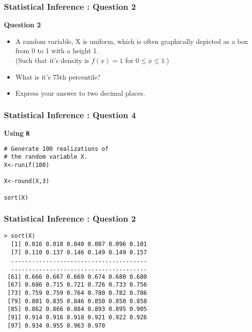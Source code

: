 \documentclass{beamer}
\begin{document}
\begin{frame}
\frametitle{Statistical Inference : Question 2}
\Large
\vspace{-1cm}
\textbf{Question 2}
\begin{itemize}
\item A random variable, X is uniform, which is often graphically depicted as a box from 0 to 1 with a height 1. \\(Such that it's density is $f(x)=1$ for $0\leq x\leq 1$.) \bigskip
\item What is it's 75th percentile?

\item Express your answer to two decimal places.

\end{itemize}
\end{frame}
\begin{frame}[fragile]
\frametitle{Statistical Inference : Question 4}
\Large

\vspace{-1cm}

\textbf{Using \texttt{R}}
\begin{framed}
\begin{verbatim}
# Generate 100 realizations of 
# the random variable X.
X<-runif(100)

X<-round(X,3)

sort(X)
\end{verbatim}
\end{framed}
\end{frame}
\begin{frame}[fragile]
\frametitle{Statistical Inference : Question 2}

\begin{framed}
\begin{verbatim}
> sort(X)
  [1] 0.016 0.018 0.040 0.087 0.096 0.101
  [7] 0.110 0.137 0.146 0.149 0.149 0.157
  .......................................
  .......................................
 [61] 0.666 0.667 0.669 0.674 0.680 0.680
 [67] 0.686 0.715 0.721 0.726 0.733 0.756
 [73] 0.759 0.759 0.764 0.780 0.782 0.786
 [79] 0.801 0.835 0.846 0.850 0.850 0.858
 [85] 0.862 0.866 0.884 0.893 0.895 0.905
 [91] 0.914 0.916 0.918 0.921 0.922 0.926
 [97] 0.934 0.955 0.963 0.970
\end{verbatim}
\end{framed}
\end{frame}
\end{document}
